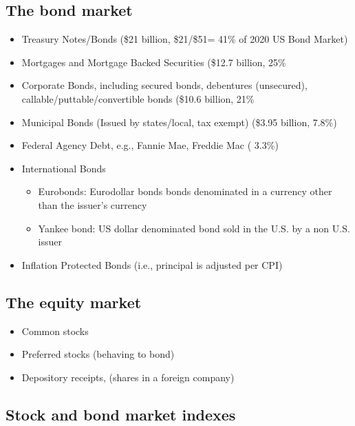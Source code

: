 \documentclass[
]{book}
\providecommand{\tightlist}{%
  \setlength{\itemsep}{0pt}\setlength{\parskip}{0pt}}
\begin{document}
\hypertarget{the-bond-market}{%
\subsection{The bond market}\label{the-bond-market}}

\begin{itemize}
\tightlist
\item
  Treasury Notes/Bonds (\$21 billion, \$21/\$51= 41\% of 2020 US Bond Market)
\item
  Mortgages and Mortgage Backed Securities (\$12.7 billion, 25\%
\item
  Corporate Bonds, including secured bonds, debentures (unsecured), callable/puttable/convertible bonds (\$10.6 billion, 21\%
\item
  Municipal Bonds (Issued by states/local, tax exempt) (\$3.95 billion, 7.8\%)
\item
  Federal Agency Debt, e.g., Fannie Mae, Freddie Mac ( 3.3\%)
\item
  International Bonds

  \begin{itemize}
  \tightlist
  \item
    Eurobonds: Eurodollar bonds bonds denominated in a currency other than the issuer's currency
  \item
    Yankee bond: US dollar denominated bond sold in the U.S. by a non U.S. issuer
  \end{itemize}
\item
  Inflation Protected Bonds (i.e., principal is adjusted per CPI)
\end{itemize}

\hypertarget{the-equity-market}{%
\subsection{The equity market}\label{the-equity-market}}

\begin{itemize}
\tightlist
\item
  Common stocks
\item
  Preferred stocks (behaving to bond)
\item
  Depository receipts, (shares in a foreign company)
\end{itemize}

\hypertarget{stock-and-bond-market-indexes}{%
\subsection{Stock and bond market indexes}\label{stock-and-bond-market-indexes}}
\end{document}
